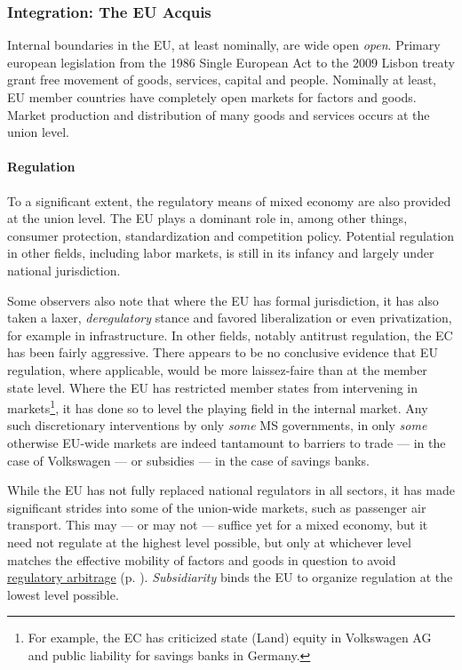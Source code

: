 \documentclass[11pt,a4paper,oneside,openright]{article}
\begin{document}
\subsubsection[Integration]{Integration: The EU Acquis} \label{sec:EU_Acquis}
Internal boundaries in the \gls{EU}, at least nominally, are wide open \emph{open}. %
Primary european legislation from the 1986 Single European Act to the 2009 Lisbon treaty grant free movement of goods, services, capital and people. Nominally at least, \gls{EU} member countries have completely open markets for factors and goods. Market production and distribution of many goods and services occurs at the union level.

\paragraph{Regulation} To a significant extent, the regulatory means of mixed economy are also provided at the union level. The \gls{EU} plays a dominant role in, among other things, consumer protection, standardization and competition policy. Potential regulation in other fields, including labor markets, is still in its infancy and largely under national jurisdiction. %

Some observers also note that where the \gls{EU} has formal jurisdiction, it has also taken a laxer, \emph{deregulatory} stance and favored liberalization or even privatization, for example in infrastructure. %
In other fields, notably antitrust regulation, the \gls{EC} has been fairly aggressive. There appears to be no conclusive evidence that \gls{EU} regulation, where applicable, would be more laissez-faire than at the member state level. %
Where the \gls{EU} has restricted member states from intervening in markets\footnote{
	For example, the \gls{EC} has criticized state (Land) equity in Volkswagen AG and public liability for savings banks in Germany.}, 
it has done so to level the playing field in the internal market. Any such discretionary interventions by only \emph{some} \gls{MS} governments, in only \emph{some} otherwise \gls{EU}-wide markets are indeed tantamount to barriers to trade --- in the case of Volkswagen --- or subsidies --- in the case of savings banks.  %

While the \gls{EU} has not fully replaced national regulators in all sectors, it has made significant strides into some of the union-wide markets, such as passenger air transport. This may --- or may not --- suffice yet for a mixed economy, but it need not regulate at the highest level possible, but only at whichever level matches the effective mobility of factors and goods in question to avoid \hyperref[sec:regulatory]{regulatory arbitrage} (p. \pageref{sec:regulatory}). \emph{Subsidiarity} binds the \gls{EU} to organize regulation at the lowest level possible.
\end{document}
